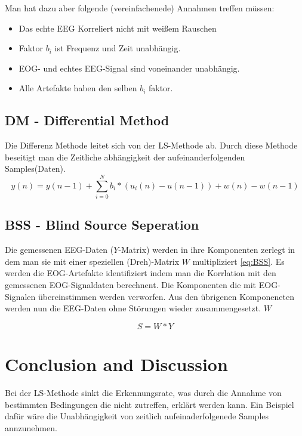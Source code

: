 \documentclass[preprint,12pt]{elsarticle}
\begin{document}
Man hat dazu aber folgende (vereinfachenede) Annahmen treffen müssen:
\begin{itemize}
 \item Das echte EEG Korreliert nicht mit weißem Rauschen
 \item Faktor $b_i$ ist Frequenz und Zeit unabhängig.
 \item EOG- und echtes EEG-Signal sind voneinander unabhängig.
 \item Alle Artefakte haben den selben $b_i$ faktor.
\end{itemize}




\subsection{DM - Differential Method}

Die Differenz Methode leitet sich von der LS-Methode ab. Durch diese Methode beseitigt man die Zeitliche abhängigkeit der aufeinanderfolgenden Samples(Daten).
~\cite{Thulasidas2004}
\begin{equation} \label{eq:DM}
 y(n) = y(n - 1) + \sum_{i=0}^{N}  b_i * (u_i(n) - u(n - 1)) + w(n) - w(n - 1)
\end{equation}



\subsection{BSS - Blind Source Seperation}
Die gemessenen EEG-Daten ($Y$-Matrix) werden in ihre Komponenten zerlegt in dem man sie mit einer speziellen (Dreh)-Matrix $W$ multipliziert \ref{eq:BSS}.
Es werden die EOG-Artefakte identifiziert indem man die Korrlation mit den gemessenen EOG-Signaldaten  berechnent. Die Komponenten die mit EOG-Signalen übereinstimmen werden
verworfen. Aus den übrigenen Komponeneten werden nun die EEG-Daten ohne Störungen wieder zusammengesetzt.
$W$
~\cite{Thulasidas2004}

\begin{equation} \label{eq:BSS}
 S = W*Y
\end{equation}


\section{Conclusion and Discussion}
Bei der LS-Methode sinkt die Erkennungsrate, was durch die Annahme von bestimmten Bedingungen die nicht zutreffen, erklärt werden kann.
 Ein Beispiel dafür wäre die Unabhängigkeit von zeitlich aufeinaderfolgenede Samples annzunehmen.
\end{document}
